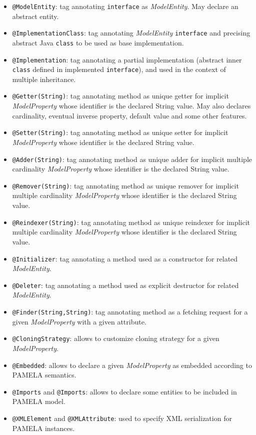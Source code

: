 \begin{itemize}
    \item \texttt{@ModelEntity}: tag annotating \texttt{interface} as \emph{ModelEntity}. May declare an abstract entity.
    \item \texttt{@ImplementationClass}: tag annotating \emph{ModelEntity} \texttt{interface} and precising abstract Java \texttt{class} to be used as base implementation.
    \item \texttt{@Implementation}: tag annotating a partial implementation (abstract inner \texttt{class} defined in implemented \texttt{interface}), and used in the context of multiple inheritance.
    \item \texttt{@Getter(String)}: tag annotating method as unique getter for implicit \emph{ModelProperty} whose identifier is the declared String value. May also declares cardinality, eventual inverse property, default value and some other features.
    \item \texttt{@Setter(String)}: tag annotating method as unique setter for implicit \emph{ModelProperty} whose identifier is the declared String value.
    \item \texttt{@Adder(String)}: tag annotating method as unique adder for implicit multiple cardinality \emph{ModelProperty} whose identifier is the declared String value.
    \item \texttt{@Remover(String)}: tag annotating method as unique remover for implicit multiple cardinality \emph{ModelProperty} whose identifier is the declared String value.
    \item \texttt{@Reindexer(String)}: tag annotating method as unique reindexer for implicit multiple cardinality \emph{ModelProperty} whose identifier is the declared String value.
    \item \texttt{@Initializer}: tag annotating a method used as a constructor for related \emph{ModelEntity}.
   \item \texttt{@Deleter}: tag annotating a method used as explicit destructor for related \emph{ModelEntity}.
    \item \texttt{@Finder(String,String)}: tag annotating method as a fetching request for a given \emph{ModelProperty} with a given attribute.
    \item \texttt{@CloningStrategy}: allows to customize cloning strategy for a given \emph{ModelProperty}.
    \item \texttt{@Embedded}: allows to declare a given \emph{ModelProperty} as embedded according to PAMELA semantics.
    \item \texttt{@Imports} and \texttt{@Imports}: allows to declare some entities to be included in PAMELA model.
    \item \texttt{@XMLElement} and \texttt{@XMLAttribute}: used to specify XML serialization for PAMELA instances.
    
\end{itemize}


